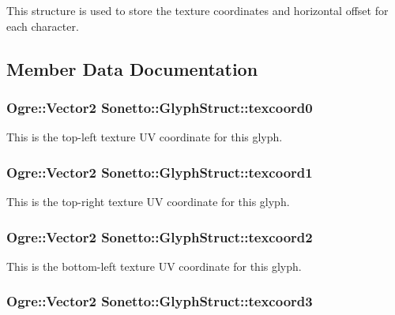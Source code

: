 This structure is used to store the texture coordinates and horizontal offset for each character. 

\subsection{Member Data Documentation}
\subsubsection{\setlength{\rightskip}{0pt plus 5cm}Ogre::Vector2 {\bf Sonetto::GlyphStruct::texcoord0}}\label{struct_sonetto_1_1_glyph_struct_066234d3439b47c9e4ddd6a4899ccc36}


This is the top-left texture UV coordinate for this glyph. 

\subsubsection{\setlength{\rightskip}{0pt plus 5cm}Ogre::Vector2 {\bf Sonetto::GlyphStruct::texcoord1}}\label{struct_sonetto_1_1_glyph_struct_40b03c6fb8424a7c82ece23996621890}


This is the top-right texture UV coordinate for this glyph. 

\subsubsection{\setlength{\rightskip}{0pt plus 5cm}Ogre::Vector2 {\bf Sonetto::GlyphStruct::texcoord2}}\label{struct_sonetto_1_1_glyph_struct_17cfcc4496af866a23e81c536963f5c4}


This is the bottom-left texture UV coordinate for this glyph. 

\subsubsection{\setlength{\rightskip}{0pt plus 5cm}Ogre::Vector2 {\bf Sonetto::GlyphStruct::texcoord3}}\label{struct_sonetto_1_1_glyph_struct_c2adcdb7f05f5538d56d24980471dff9}


